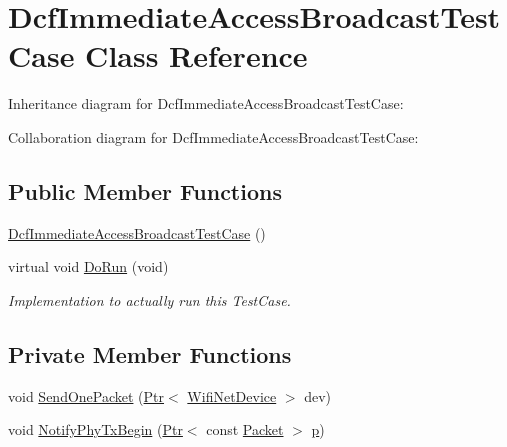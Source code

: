 \hypertarget{classDcfImmediateAccessBroadcastTestCase}{}\section{Dcf\+Immediate\+Access\+Broadcast\+Test\+Case Class Reference}
\label{classDcfImmediateAccessBroadcastTestCase}


Inheritance diagram for Dcf\+Immediate\+Access\+Broadcast\+Test\+Case\+:


Collaboration diagram for Dcf\+Immediate\+Access\+Broadcast\+Test\+Case\+:
\subsection*{Public Member Functions}
\begin{DoxyCompactItemize}
\item 
\hyperlink{classDcfImmediateAccessBroadcastTestCase_a8546a12478615efc1f8fad33ead2c054}{Dcf\+Immediate\+Access\+Broadcast\+Test\+Case} ()
\item 
virtual void \hyperlink{classDcfImmediateAccessBroadcastTestCase_a60a5b36d456c0c144d85a9be722c1663}{Do\+Run} (void)
\begin{DoxyCompactList}\small\item\em Implementation to actually run this Test\+Case. \end{DoxyCompactList}\end{DoxyCompactItemize}
\subsection*{Private Member Functions}
\begin{DoxyCompactItemize}
\item 
void \hyperlink{classDcfImmediateAccessBroadcastTestCase_ac1f6f4b2af66dda401e082762cee8adb}{Send\+One\+Packet} (\hyperlink{classns3_1_1Ptr}{Ptr}$<$ \hyperlink{classns3_1_1WifiNetDevice}{Wifi\+Net\+Device} $>$ dev)
\item 
void \hyperlink{classDcfImmediateAccessBroadcastTestCase_aea9ca6e51a5ef1b43729b86e4ac209d2}{Notify\+Phy\+Tx\+Begin} (\hyperlink{classns3_1_1Ptr}{Ptr}$<$ const \hyperlink{classns3_1_1Packet}{Packet} $>$ \hyperlink{lte__link__budget__x2__handover__measures_8m_ac9de518908a968428863f829398a4e62}{p})
\end{DoxyCompactItemize}
